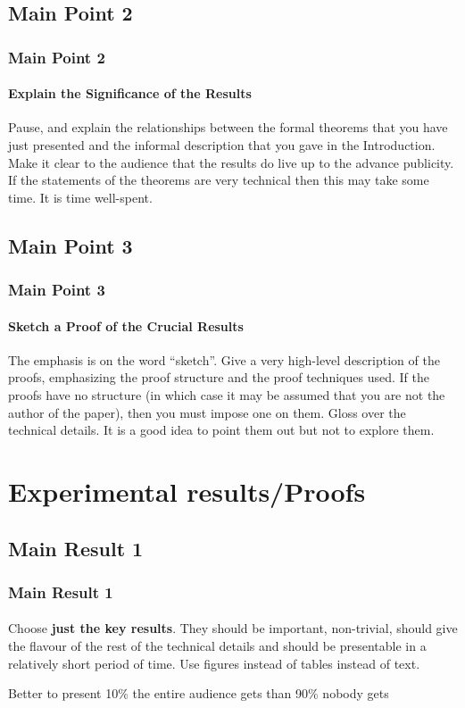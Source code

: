 \documentclass[11pt]{beamer}              %
\begin{document}
\subsection{Main Point 2}
\begin{frame}
\frametitle{Main Point 2}
\framesubtitle{Explain the Significance of the Results}
Pause, and explain the relationships between the formal theorems that you have just presented and the informal description that you gave in the Introduction. Make it clear to the audience that the results do live up to the advance publicity. If the statements of the theorems are very technical then this may take some time. It is time well-spent.

\end{frame}

\subsection{Main Point 3}
\begin{frame}
\frametitle{Main Point 3}
\framesubtitle{Sketch a Proof of the Crucial Results}
The emphasis is on the word ``sketch''. Give a very high-level description of the proofs, emphasizing the proof structure and the proof techniques used. If the proofs have no structure (in which case it may be assumed that you are not the author of the paper), then you must impose one on them. Gloss over the technical details. It is a good idea to point them out but not to explore them.
\end{frame}


\section{Experimental results/Proofs}

\subsection{Main Result 1}
\begin{frame}
\frametitle{Main Result 1}
\framesubtitle{}
Choose \textbf{just the key results}. They should be important, non-trivial, should give the flavour of the rest of the technical details and should be presentable in a relatively short period of time. Use figures instead of tables instead of text.

Better to present 10\% the entire audience gets than 90\% nobody gets
\end{frame}
\end{document}
